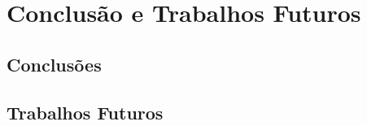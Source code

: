 
\chapter{Conclusão e Trabalhos Futuros}
\label{cap:conclusao}







\section{Conclusões}



\section{Trabalhos Futuros}



